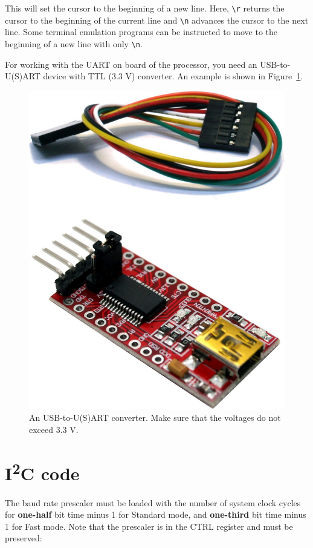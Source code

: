 \documentclass[12pt]{article}
\begin{document}
This will set the cursor to the beginning of a new line. Here, \lstinline|\r| returns the cursor to the beginning of the current line and \lstinline|\n| advances the cursor to the next line. Some terminal emulation programs can be instructed to move to the beginning of a new line with only \lstinline|\n|.

For working with the UART on board of the processor, you need an USB-to-U(S)ART device with TTL (3.3 V) converter. An example is shown in Figure~\ref{fig:usb-usart-ttl}.

\begin{figure}[!ht]
\centering
\includegraphics[scale=0.1]{usb-usart-ttl}
\caption{An USB-to-U(S)ART converter. Make sure that the voltages do not exceed 3.3 V.}
\label{fig:usb-usart-ttl}
\end{figure}


\section{I\textsuperscript{2}C code}
The baud rate prescaler must be loaded with the number of system clock cycles for \textbf{one-half} bit time minus 1 for Standard mode, and \textbf{one-third} bit time minus 1 for Fast mode. Note that the prescaler is in the CTRL register and must be preserved:
\end{document}
